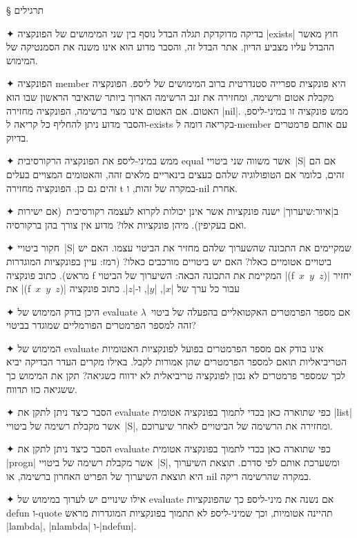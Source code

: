§ תרגילים
\begin{enumerate}
  ✦ בדיקה מדוקדקת תגלה הבדל נוסף בין שני המימושים של הפונקציה \E|exists| חוץ
  מאשר ההבדל עליו מצביע הדיון. אתר הבדל זה, והסבר מדוע הוא אינו משנה את
  הסמנטיקה של המימוש.

  ✦ הפונקציה member היא פונקצית ספרייה סטנדרטית ברוב המימושים של ליספ. הפונקציה
  מקבלת אטום ורשימה, ומחזירה את זנב הרשימה הארוך ביותר שהאיבר הראשון שבו הוא
  האטום. אם האטום אינו מצוי ברשימה, הפונקציה מחזירה \E|nil|. ממש פונקציה זו
  במיני-ליספ, והסבר מדוע ניתן להחליף כל קריאה ל-exists בקריאה דומה
  ל-member עם אותם פרמטרים בדיוק.

  ✦ ממש במיני-ליספ את הפונקציה הרקורסיבית equal אשר משווה שני ביטויי~\E|S| אם
  הם זהים, כלומר אם הטופולוגיה שלהם כעצים בינאריים מלאים זהה, והאטומים המצויים
  בעלים זהים גם כן. הפונקציה מחזירה t במקרה של זהות, ו-nil אחרת.

  ✦ ב|איור:שיערוך| ישנה פונקציות אשר אינן יכולות לקרוא לעצמה רקורסיבית~(אם
  ישירות ואם בעקיפין). מיהן פונקציות אלו? מדוע אין צורך בהן ברקורסיה.

  ✦ חקור ביטויי~\E|S| שמקיימים את התכונה שהשערוך שלהם מחזיר את הביטוי עצמו. האם
  יש ביטויים אטומיים כאלו? האם יש ביטויים מורכבים כאלו? (רמז: עיין בפונקציות
  המוגדרות מראש). כתוב פונקציה f המקיימת את התכונה הבאה: השיערוך של הביטוי
  \E|(f~$x$~$y$~$z$)| יחזיר את \E|(f~$x$~$y$~$z$)| עבור כל ערך של \E|$x$|,
  \E|$y$|, ו-\E|$z$|. כתוב פונקציה

  ✦ היכן בודק המימוש של evaluate אם מספר הפרמטרים האקטואליים בהפעלה של
  ביטוי~$λ$ זהה למספר הפרמטרים הפורמליים שמוגדר בביטוי?

  ✦ המימוש של evaluate אינו בודק אם מספר הפרמטרים בפועל לפונקציות האטומיות
  הטריביאליות תואם למספר הפרמטרים שהן אמורות לקבל. באילו מקרים העדר הבדיקה יביא
  לכך שמספר פרמטרים לא נכון לפונקציה טריביאלית לא ידווח כשגיאה? תקן את המימוש
  כך ששגיאה כזו תדווח.

  ✦ הסבר כיצד ניתן לתקן את evaluate כפי שתוארה כאן בכדי לתמוך בפונקציה אטומית
  \E|list| אשר מקבלת רשימה של ביטויי~\E|S|, ומחזירה את הרשימה של הביטויים לאחר
  שיערוכם.

  ✦ הסבר כיצד ניתן לתקן את evaluate כפי שתוארה כאן בכדי לתמוך בפונקציה אטומית
  \E|progn| אשר מקבלת רשימה של ביטויי~\E|S|, ומשערכת אותם לפי סדרם. תוצאת
  השיערוך היא תוצאת השיערוך של הפריט האחרון ברשימה, או nil במקרה שהרשימה ריקה.

  ✦ אילו שינויים יש לערוך במימוש של evaluate אם נשנה את מיני-ליספ כך שהפונקציות
  defun ו-quote תהיינה אטומיות, וכך שמיני-ליספ לא תתמוך בפונקציות המוגדרות
  מראש \E|lambda|, \E|nlambda| ו-\E|ndefun|.


\end{enumerate}
